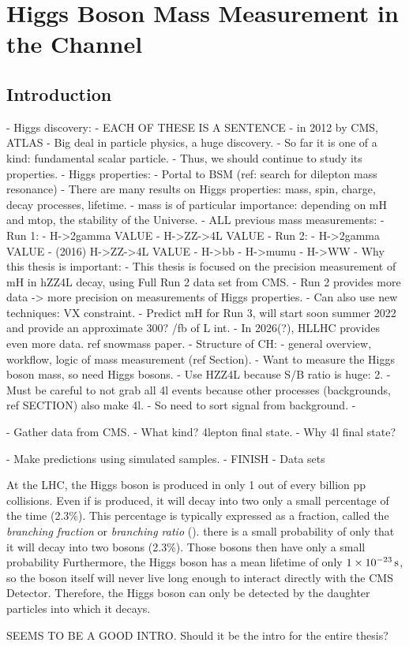 \chapter{Higgs Boson Mass Measurement in the \hzzfourl Channel}
\section{Introduction}
- Higgs discovery:
    - EACH OF THESE IS A SENTENCE
    - in 2012 by CMS, ATLAS
    - Big deal in particle physics, a huge discovery.
    - So far it is one of a kind: fundamental scalar particle.
    - Thus, we should continue to study its properties.
- Higgs properties:
    - Portal to BSM (ref: search for dilepton mass resonance)
    - There are many results on Higgs properties: mass, spin, charge, decay processes, lifetime.
    - mass is of particular importance: depending on mH and mtop, the stability of the Universe.
- ALL previous mass measurements:
    - Run 1:
        - H->2gamma VALUE
        - H->ZZ->4L VALUE
    - Run 2:
        - H->2gamma VALUE
        - (2016) H->ZZ->4L VALUE
        - H->bb
        - H->mumu
        - H->WW 
- Why this thesis is important:
    - This thesis is focused on the precision measurement of mH in hZZ4L decay, using Full Run 2 data set from CMS.
    - Run 2 provides more data -> more precision on measurements of Higgs properties.
    - Can also use new techniques: VX constraint.
    - Predict mH for Run 3, will start soon summer 2022 and provide an approximate 300? /fb of L int.
    - In 2026(?), HLLHC provides even more data. ref snowmass paper.
- Structure of CH:
    - general overview, workflow, logic of mass measurement (ref Section).
        - Want to measure the Higgs boson mass, so need Higgs bosons.
        - Use HZZ4L because S/B ratio is huge: 2.
        - Must be careful to not grab all 4l events because other processes (backgrounds, ref SECTION) also make 4l.
            - So need to sort signal from background.
        - 


            - Gather data from CMS.
            - What kind? 4lepton final state.
                - Why 4l final state?
                  
        - Make predictions using simulated samples.
        - FINISH
    - Data sets




At the LHC, the Higgs boson is produced in only 1 out of every billion pp collisions.
Even if \PH is produced, it will decay into two \PZ only a small percentage of the time (2.3\%).
This percentage is typically expressed as a fraction, called the \emph{branching fraction} or \emph{branching ratio} (\br).
there is a small probability of only  that it will decay into two \PZ bosons (2.3\%).
Those \PZ bosons then have only a small probability 
Furthermore, the Higgs boson has a mean lifetime of only $1 \times \text{10}^\text{$-$23}\,\text{s}$,
so the boson itself will never live long enough to interact directly with the CMS Detector.
Therefore, the Higgs boson can only be detected by the daughter particles into which it decays.




SEEMS TO BE A GOOD INTRO. Should it be the intro for the entire thesis?
